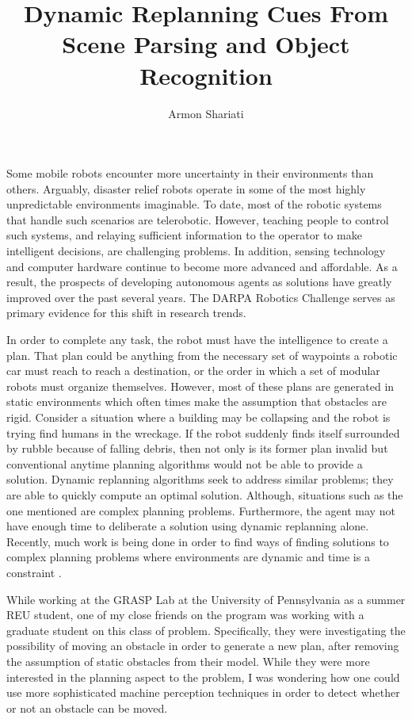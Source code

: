 \documentclass[10pt]{article}
\begin{document}
\author{Armon Shariati}
\title{Dynamic Replanning Cues From Scene Parsing and Object Recognition}
\date{}
\maketitle

Some mobile robots encounter more uncertainty in their environments than
others.  Arguably, disaster relief robots operate in some of the most highly
unpredictable environments imaginable. To date, most of the robotic systems
that handle such scenarios are telerobotic. However, teaching people to control
such systems, and relaying sufficient information to the operator to make
intelligent decisions, are challenging problems. In addition, sensing
technology and computer hardware continue to become more advanced and
affordable. As a result, the prospects of developing autonomous agents as
solutions have greatly improved over the past several years. The DARPA Robotics
Challenge serves as primary evidence for this shift in research trends.

In order to complete any task, the robot must have the intelligence to create a
plan. That plan could be anything from the necessary set of waypoints a robotic
car must reach to reach a destination, or the order in which a set of modular
robots must organize themselves. However, most of these plans are generated in
static environments which often times make the assumption that obstacles are
rigid. Consider a situation where a building may be collapsing and the robot is
trying find humans in the wreckage. If the robot suddenly finds itself
surrounded by rubble because of falling debris, then not only is its former
plan invalid but conventional anytime planning algorithms would not be able to
provide a solution. Dynamic replanning algorithms seek to address similar
problems; they are able to quickly compute an optimal solution. Although,
situations such as the one mentioned are complex planning problems.
Furthermore, the agent may not have enough time to deliberate a solution using
dynamic replanning alone.  Recently, much work is being done in order to find
ways of finding solutions to complex planning problems where environments are
dynamic and time is a constraint \cite{likhachev}.

While working at the GRASP Lab at the University of Pennsylvania as a summer
REU student, one of my close friends on the program was working with a graduate
student on this class of problem. Specifically, they were investigating the
possibility of moving an obstacle in order to generate a new plan, after
removing the assumption of static obstacles from their model. While they were
more interested in the planning aspect to the problem, I was wondering how one
could use more sophisticated machine perception techniques in order to detect
whether or not an obstacle can be moved.
\end{document}
